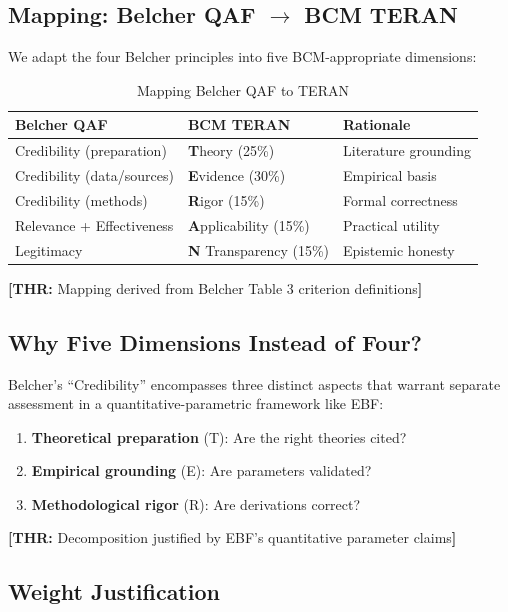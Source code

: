 \documentclass[11pt,a4paper]{article}
\newcommand{\tagTHR}[1]{\textcolor{thrblue}{\textbf{[THR:} #1\textbf{]}}}
\begin{document}
\subsection{Mapping: Belcher QAF $\rightarrow$ BCM TERAN}

We adapt the four Belcher principles into five BCM-appropriate dimensions:

\begin{table}[h]
\centering
\caption{Mapping Belcher QAF to TERAN}
\label{tab:mapping}
\begin{tabular}{lll}
\toprule
\textbf{Belcher QAF} & \textbf{BCM TERAN} & \textbf{Rationale} \\
\midrule
Credibility (preparation) & \textbf{T}heory (25\%) & Literature grounding \\
Credibility (data/sources) & \textbf{E}vidence (30\%) & Empirical basis \\
Credibility (methods) & \textbf{R}igor (15\%) & Formal correctness \\
Relevance + Effectiveness & \textbf{A}pplicability (15\%) & Practical utility \\
Legitimacy & \textbf{N} Transparency (15\%) & Epistemic honesty \\
\bottomrule
\end{tabular}
\end{table}

\tagTHR{Mapping derived from Belcher Table 3 criterion definitions}

\subsection{Why Five Dimensions Instead of Four?}

Belcher's ``Credibility'' encompasses three distinct aspects that warrant separate assessment in a quantitative-parametric framework like EBF:

\begin{enumerate}
    \item \textbf{Theoretical preparation} (T): Are the right theories cited?
    \item \textbf{Empirical grounding} (E): Are parameters validated?
    \item \textbf{Methodological rigor} (R): Are derivations correct?
\end{enumerate}

\tagTHR{Decomposition justified by EBF's quantitative parameter claims}

\subsection{Weight Justification}
\end{document}
